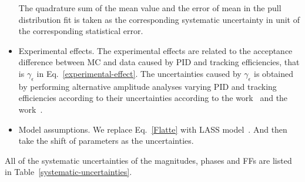 \documentclass[aps,prd,twocolumn,showpacs,amsmath,amssymb]{revtex4-1}
\begin{document}
\begin{itemize}
        The quadrature sum of the mean value and the error of mean in the pull distribution fit is taken as the corresponding systematic uncertainty in unit of the corresponding statistical error.
    \item \uppercase\expandafter{} Experimental effects. 
        The experimental effects are related to the acceptance difference between MC and data caused by PID and tracking efficiencies, that is $\gamma_{\epsilon}$ in Eq.~\ref{experimental-effect}.
        The uncertainties caused by $\gamma_{\epsilon}$ is obtained by performing alternative amplitude analyses varying PID and tracking efficiencies according to their uncertainties according to the work~\cite{PID} and the work~\cite{Tracking}.
    \item \uppercase\expandafter{} Model assumptions. 
        We replace Eq.~\ref{Flatte} with LASS model~\cite{LASS}.
        And then take the shift of parameters as the uncertainties.
\end{itemize}

All of the systematic uncertainties of the magnitudes, phases and FFs are listed in Table~\ref{systematic-uncertainties}.
\end{document}
